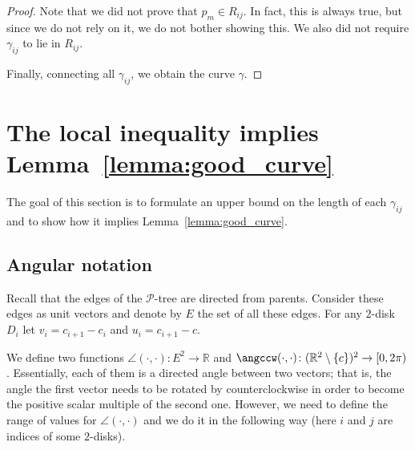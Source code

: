 \begin{proof}
Note that we did not prove that $p_m\in R_{ij}$. In fact, this is always true, but since we do not rely on it, we do not bother showing this. We also did not require $\gamma_{ij}$ to lie in $R_{ij}$.

Finally, connecting all $\gamma_{ij}$, we obtain the curve $\gamma$.

\end{proof}


\section{The local inequality implies Lemma~\ref{lemma:good_curve}}

The goal of this section is to formulate an upper bound on the length of each $\gamma_{ij}$ and to show how it implies Lemma~\ref{lemma:good_curve}.

\subsection{Angular notation}

Recall that the edges of the $\mathcal{P}$-tree are directed from parents. Consider these edges as unit vectors and denote by $E$ the set of all these edges.
For any $2$-disk $D_i$ let $v_i = c_{i+1} - c_i$ and $u_i = c_{i+1} - c$.

We define two functions $\angle(\cdot, \cdot)\colon E^2\to\mathbb{R}$ and $\angccw(\cdot, \cdot)\colon (\mathbb{R}^2\setminus\{c\})^2\to[0, 2\pi)$. Essentially, each of them is a directed angle between two vectors; that is, the angle the first vector needs to be rotated by counterclockwise in order to become the positive scalar multiple of the second one. However, we need to define the range of values for $\angle(\cdot, \cdot)$ and we do it in the following way (here $i$ and $j$ are indices of some $2$-disks).

